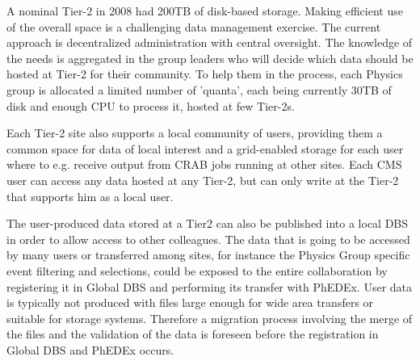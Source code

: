 A nominal Tier-2 in 2008 had 200TB of disk-based storage.
Making efficient use of the overall space is a challenging data management exercise.
The current approach is decentralized administration with central oversight.
The knowledge of the needs is aggregated in the group leaders who will decide which data should be hosted at Tier-2 for their community. To help
them in the process, each Physics group is allocated a limited number 
of 'quanta', each being currently 30TB of disk and enough CPU to process it, hosted at few Tier-2s. 

Each Tier-2 site also supports a local community of users, providing them
a common space for data of local interest and a grid-enabled
storage for each user where to e.g. receive output from CRAB jobs
running at other sites. Each CMS user can access any data
hosted at any Tier-2, but can only write at the Tier-2 that supports him
as a local user.

The user-produced data stored at a Tier2 can also be published into a local DBS
in order to allow access to other colleagues.
The data that is going to be accessed by many users or transferred among sites, for instance the Physics Group specific event filtering and selections,
could be exposed to the entire collaboration by registering it in Global DBS and performing its transfer with PhEDEx.
User data is typically not produced with files large enough for wide area transfers or suitable for storage systems. Therefore a migration process involving the merge of the files and the validation of the data is foreseen before the registration in Global DBS and PhEDEx occurs.
 
